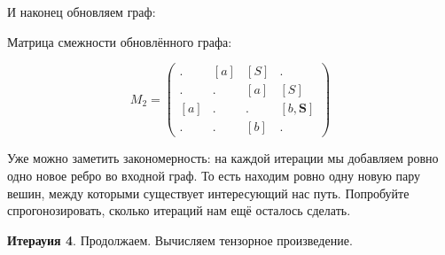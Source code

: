 \begin{example}
И наконец обновляем граф:
\begin{pic}
\begin{center}
\end{center}
\end{pic}

Матрица смежности обновлённого графа:

$$ M_2 =
\begin{pmatrix} 
. & [a] & [S] & . \\
. & . & [a] & [S] \\
[a] & . & . & [b, \textbf{S}] \\
. & . & [b] & . 
\end{pmatrix}
$$

Уже можно заметить закономерность: на каждой итерации мы добавляем ровно одно новое ребро во входной граф.
То есть находим ровно одну новую пару вешин, между которыми существует интересующий нас путь.
Попробуйте спрогонозировать, сколько итераций нам ещё осталось сделать.

\textbf{Итерауия 4}.
Продолжаем. Вычисляем тензорное произведение.


\end{example}
